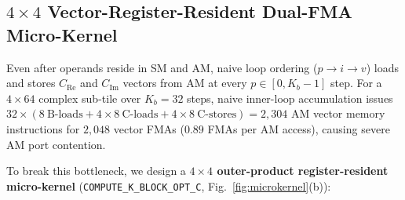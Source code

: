 \documentclass[conference]{IEEEtran}
\begin{document}
\subsection{$4 \times 4$ Vector-Register-Resident Dual-FMA Micro-Kernel}
Even after operands reside in SM and AM, naive loop ordering ($p \to i \to v$) loads and stores $C_{\mathrm{Re}}$ and $C_{\mathrm{Im}}$ vectors from AM at every $p \in [0, K_b - 1]$ step. For a $4 \times 64$ complex sub-tile over $K_b = 32$ steps, naive inner-loop accumulation issues $32 \times (8~\text{B-loads} + 4 \times 8~\text{C-loads} + 4 \times 8~\text{C-stores}) = 2{,}304$ AM vector memory instructions for $2{,}048$ vector FMAs ($0.89$ FMAs per AM access), causing severe AM port contention.

To break this bottleneck, we design a \textbf{$4 \times 4$ outer-product register-resident micro-kernel} (\texttt{COMPUTE\_K\_BLOCK\_OPT\_C}, Fig.~\ref{fig:microkernel}(b)):
\end{document}
